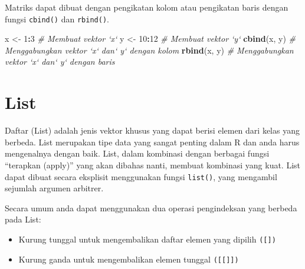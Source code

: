 \documentclass[
]{book}
\newenvironment{Shaded}{\begin{snugshade}}{\end{snugshade}}
\newcommand{\CommentTok}[1]{\textcolor[rgb]{0.56,0.35,0.01}{\textit{#1}}}
\newcommand{\DecValTok}[1]{\textcolor[rgb]{0.00,0.00,0.81}{#1}}
\newcommand{\KeywordTok}[1]{\textcolor[rgb]{0.13,0.29,0.53}{\textbf{#1}}}
\newcommand{\NormalTok}[1]{#1}
\newcommand{\OperatorTok}[1]{\textcolor[rgb]{0.81,0.36,0.00}{\textbf{#1}}}
\newcommand{\StringTok}[1]{\textcolor[rgb]{0.31,0.60,0.02}{#1}}
\providecommand{\tightlist}{%
  \setlength{\itemsep}{0pt}\setlength{\parskip}{0pt}}
\begin{document}
Matriks dapat dibuat dengan pengikatan kolom atau pengikatan baris dengan fungsi \texttt{cbind()} dan \texttt{rbind()}.

\begin{Shaded}
\begin{Highlighting}[]
\NormalTok{x <-}\StringTok{ }\DecValTok{1}\OperatorTok{:}\DecValTok{3}                                 \CommentTok{# Membuat vektor `x`}
\NormalTok{y <-}\StringTok{ }\DecValTok{10}\OperatorTok{:}\DecValTok{12}                               \CommentTok{# Membuat vektor `y`}
\KeywordTok{cbind}\NormalTok{(x, y)                              }\CommentTok{# Menggabungkan vektor `x` dan` y` dengan kolom}
\KeywordTok{rbind}\NormalTok{(x, y)                              }\CommentTok{# Menggabungkan vektor `x` dan` y` dengan baris}
\end{Highlighting}
\end{Shaded}

\hypertarget{list}{%
\section{List}\label{list}}

Daftar (List) adalah jenis vektor khusus yang dapat berisi elemen dari kelas yang berbeda. List merupakan tipe data yang sangat penting dalam R dan anda harus mengenalnya dengan baik. List, dalam kombinasi dengan berbagai fungsi ``terapkan (apply)'' yang akan dibahas nanti, membuat kombinasi yang kuat. List dapat dibuat secara eksplisit menggunakan fungsi \texttt{list()}, yang mengambil sejumlah argumen arbitrer.

Secara umum anda dapat menggunakan dua operasi pengindeksan yang berbeda pada List:

\begin{itemize}
\tightlist
\item
  Kurung tunggal untuk mengembalikan daftar elemen yang dipilih \texttt{({[}{]})}
\item
  Kurung ganda untuk mengembalikan elemen tunggal \texttt{({[}{[}{]}{]})}
\end{itemize}
\end{document}
